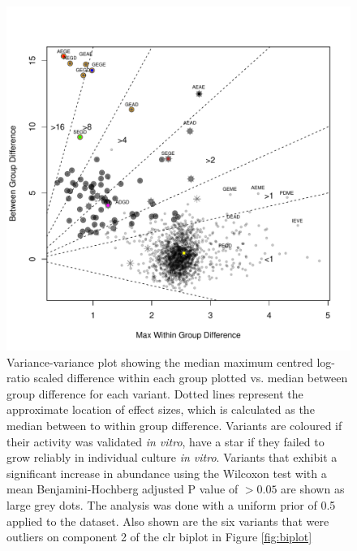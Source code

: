 \documentclass[article]{ajs}\usepackage[]{graphicx}\usepackage[]{color}
\begin{document}
\begin{figure}[!ht]
\centerline{\includegraphics[width=4.6in]{figs/all_tested.pdf}}
\vspace{3mm} \caption{Variance-variance plot showing the median maximum centred log-ratio scaled difference within each group plotted vs. median between group difference for each variant. Dotted lines represent the approximate location of effect sizes, which is calculated as the median between to within group difference. Variants are coloured if their activity was validated \emph{in vitro}, have a star if they failed to grow reliably in individual culture \emph{in vitro}. Variants that exhibit a significant increase in abundance using the Wilcoxon test with a mean Benjamini-Hochberg adjusted P value of $> 0.05$ are shown as large grey dots. The analysis was done with a uniform prior of 0.5 applied to the dataset. Also shown are the six variants that were outliers on component 2 of the clr biplot in Figure \ref{fig:biplot}}
\label{fig:vv}
\end{figure}
\end{document}
